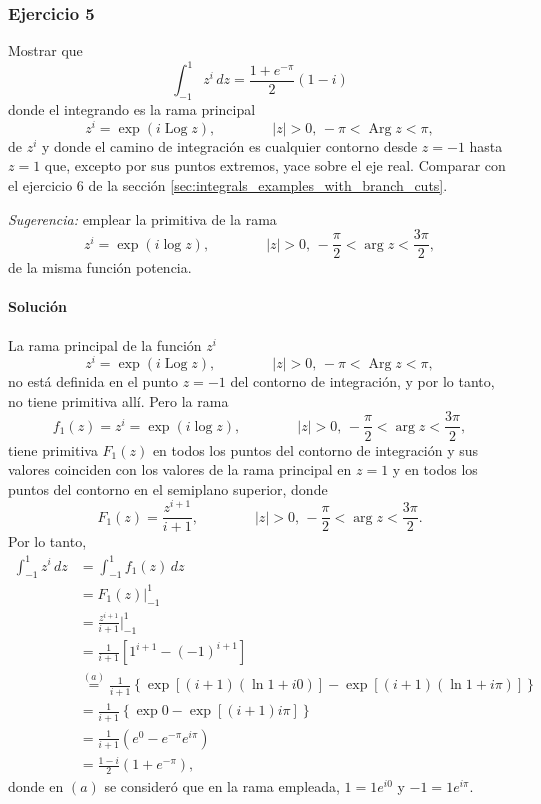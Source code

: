 \documentclass[a4paper]{report}
\DeclareMathOperator{\Arg}{Arg}
\DeclareMathOperator{\Log}{Log}
\begin{document}
\subsubsection*{Ejercicio 5}

Mostrar que 
\[
 \int_{-1}^1z^i\,dz=\frac{1+e^{-\pi}}{2}(1-i)
\]
donde el integrando es la rama principal 
\[
 z^i=\exp(i\Log z),
 \qquad\qquad
 |z|>0,\,-\pi<\Arg z<\pi,
\]
de \(z^i\) y donde el camino de integración es cualquier contorno desde \(z=-1\) hasta \(z=1\) que, excepto por sus puntos extremos, yace sobre el eje real. Comparar con el ejercicio 6 de la sección \ref{sec:integrals_examples_with_branch_cuts}.

\emph{Sugerencia:} emplear la primitiva de la rama 
\[
 z^i=\exp(i\log z),
 \qquad\qquad
 |z|>0,\,-\frac{\pi}{2}<\arg z<\frac{3\pi}{2},
\]
de la misma función potencia.

\paragraph{Solución} La rama principal de la función \(z^i\)
\[
 z^i=\exp(i\Log z),
 \qquad\qquad
 |z|>0,\,-\pi<\Arg z<\pi,
\]
no está definida en el punto \(z=-1\) del contorno de integración, y por lo tanto, no tiene primitiva allí. Pero la rama
\[
 f_1(z)=z^i=\exp(i\log z),
 \qquad\qquad
 |z|>0,\,-\frac{\pi}{2}<\arg z<\frac{3\pi}{2},
\]
tiene primitiva \(F_1(z)\) en todos los puntos del contorno de integración y sus valores coinciden con los valores de la rama principal en \(z=1\) y en todos los puntos del contorno en el semiplano superior, donde 
\[
 F_1(z)=\frac{z^{i+1}}{i+1},
 \qquad\qquad
 |z|>0,\,-\frac{\pi}{2}<\arg z<\frac{3\pi}{2}.
\]
Por lo tanto,
\begin{align*}
 \int_{-1}^1z^i\,dz&=\int_{-1}^1f_1(z)\,dz\\
  &=F_1(z)\bigg|_{-1}^1\\
  &=\frac{z^{i+1}}{i+1}\bigg|_{-1}^1\\
  &=\frac{1}{i+1}\left[1^{i+1}-(-1)^{i+1}\right]\\
  &\overset{(a)}{=}\frac{1}{i+1}\left\{\exp\left[(i+1)(\ln1+i0)\right]-\exp\left[(i+1)(\ln1+i\pi)\right]\right\}\\
  &=\frac{1}{i+1}\left\{\exp0-\exp\left[(i+1)i\pi\right]\right\}\\
  &=\frac{1}{i+1}\left(e^0-e^{-\pi}e^{i\pi}\right)\\
  &=\frac{1-i}{2}(1+e^{-\pi}),
\end{align*}
donde en \((a)\) se consideró que en la rama empleada, \(1=1e^{i0}\) y \(-1=1e^{i\pi}\). 
\end{document}
